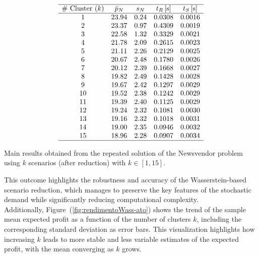 \documentclass[a4paper,12pt]{article}
\begin{document}
	\begin{table}[H]
	\[
	\begin{array}{ccccc}
		\hline
		\text{\# Cluster $(k)$} & \text{$\bar{p}_{N}$} & \text{$s_{N}$} & \text{$t_{R}$\,[s]} & \text{$t_{S}$\,[s]} \\
		\hline
		1  & 23.94 & 0.24 & 0.0308 & 0.0016 \\
		2  & 23.37 & 0.97 & 0.4309 & 0.0019 \\
		3  & 22.58 & 1.32 & 0.3329 & 0.0021 \\
		4  & 21.78 & 2.09 & 0.2615 & 0.0023 \\
		5  & 21.11 & 2.26 & 0.2129 & 0.0025 \\
		6  & 20.67 & 2.48 & 0.1780 & 0.0026 \\
		7  & 20.12 & 2.39 & 0.1668 & 0.0027 \\
		8  & 19.82 & 2.49 & 0.1428 & 0.0028 \\
		9  & 19.67 & 2.42 & 0.1297 & 0.0029 \\
		10 & 19.52 & 2.38 & 0.1242 & 0.0029 \\
		11 & 19.39 & 2.40 & 0.1125 & 0.0029 \\
		12 & 19.24 & 2.32 & 0.1081 & 0.0030 \\
		13 & 19.16 & 2.32 & 0.1018 & 0.0031 \\
		14 & 19.00 & 2.35 & 0.0946 & 0.0032 \\
		15 & 18.96 & 2.28 & 0.0907 & 0.0034 \\
		\hline
	\end{array}
	\]
	\caption{Main results obtained from the repeated solution of the Newsvendor problem using $k$ scenarios (after reduction) with $k \in [1,15]$.}
	\label{tab:wass-ato-results}
	\end{table}
	This outcome highlights the robustness and accuracy of the Wasserstein-based scenario reduction, which manages to preserve the key features of the stochastic demand while significantly reducing computational complexity.\\
	
	\noindent
	Additionally, Figure~(\ref{fig:rendimentoWass-ato}) shows the trend of the sample mean expected profit as a function of the number of clusters $k$, including the corresponding standard deviation as error bars. This visualization highlights how increasing $k$ leads to more stable and less variable estimates of the expected profit, with the mean converging as $k$ grows.
	
\end{document}
